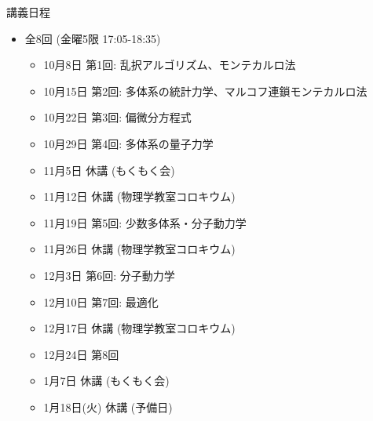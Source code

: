 \begin{frame}[t]{講義日程}
  \begin{itemize}
  \item 全8回 (金曜5限 {\color{red}17:05}-18:35)
    \begin{itemize}
    \item {\color{gray} 10月8日 第1回: 乱択アルゴリズム、モンテカルロ法}
    \item {\color{gray} 10月15日 第2回: 多体系の統計力学、マルコフ連鎖モンテカルロ法}
    \item {\color{gray} 10月22日 第3回: 偏微分方程式}
    \item {\color{gray} 10月29日 第4回: 多体系の量子力学}
    \item {\color{gray} 11月5日 休講 (もくもく会)}
    \item {\color{gray} 11月12日 休講 (物理学教室コロキウム)}
    \item 11月19日 第5回: 少数多体系・分子動力学
    \item {\color{gray} 11月26日 休講 (物理学教室コロキウム)}
    \item {\color{gray} 12月3日 第6回: 分子動力学}
    \item 12月10日 第7回: 最適化
    \item {\color{gray} 12月17日 休講 (物理学教室コロキウム)}
    \item 12月24日 第8回
    \item 1月7日 休講 (もくもく会)
    \item {\color{gray} 1月18日(火) 休講 (予備日)}
    \end{itemize}
  \end{itemize}
\end{frame}
